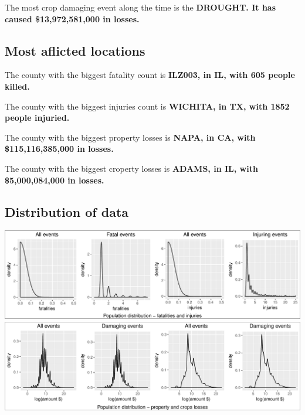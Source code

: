 \documentclass[]{article}
\begin{document}
The most crop damaging event along the time is the \textbf{DROUGHT. It
has caused \$13,972,581,000 in losses.}

\subsection{Most aflicted locations}\label{most-aflicted-locations-1}

The county with the biggest fatality count is \textbf{ILZ003, in IL,
with 605 people killed.}

The county with the biggest injuries count is \textbf{WICHITA, in TX,
with 1852 people injuried.}

The county with the biggest property losses is \textbf{NAPA, in CA, with
\$115,116,385,000 in losses.}

The county with the biggest croperty losses is \textbf{ADAMS, in IL,
with \$5,000,084,000 in losses.}

\subsection{Distribution of data}\label{distribution-of-data}

\includegraphics{readme_files/figure-latex/distribution-1.pdf}
\includegraphics{readme_files/figure-latex/distribution-2.pdf}
\end{document}
